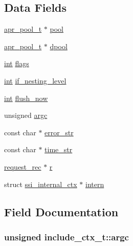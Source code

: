 \subsection*{Data Fields}
\begin{DoxyCompactItemize}
\item 
\hyperlink{structapr__pool__t}{apr\+\_\+pool\+\_\+t} $\ast$ \hyperlink{structinclude__ctx__t_af20d93a99a0b9fd4b7aaa29eb91d5195}{pool}
\item 
\hyperlink{structapr__pool__t}{apr\+\_\+pool\+\_\+t} $\ast$ \hyperlink{structinclude__ctx__t_aa60a17ecec50d2d5ce1359378abc4c05}{dpool}
\item 
\hyperlink{pcre_8txt_a42dfa4ff673c82d8efe7144098fbc198}{int} \hyperlink{structinclude__ctx__t_a8890ffbba1a44e4297b0a9445dc4ab9a}{flags}
\item 
\hyperlink{pcre_8txt_a42dfa4ff673c82d8efe7144098fbc198}{int} \hyperlink{structinclude__ctx__t_a6afca03dc4dd72a5440f1f634365a058}{if\+\_\+nesting\+\_\+level}
\item 
\hyperlink{pcre_8txt_a42dfa4ff673c82d8efe7144098fbc198}{int} \hyperlink{structinclude__ctx__t_a1822b2fd44a24681553120df1d9cdf82}{flush\+\_\+now}
\item 
unsigned \hyperlink{structinclude__ctx__t_ac9a3a1a928c6c3fae4fc6aa03c49a2e2}{argc}
\item 
const char $\ast$ \hyperlink{structinclude__ctx__t_a8f01585ae19eb53dcd5d8505d23d8ea2}{error\+\_\+str}
\item 
const char $\ast$ \hyperlink{structinclude__ctx__t_ad96f0ea28c23d20f0e7817a57dc98943}{time\+\_\+str}
\item 
\hyperlink{structrequest__rec}{request\+\_\+rec} $\ast$ \hyperlink{structinclude__ctx__t_a84929bd794dca8b08725cbc733b3f5ff}{r}
\item 
struct \hyperlink{structssi__internal__ctx}{ssi\+\_\+internal\+\_\+ctx} $\ast$ \hyperlink{structinclude__ctx__t_ad52b688b075100f9955d79dbde939340}{intern}
\end{DoxyCompactItemize}


\subsection{Field Documentation}
\subsubsection[{\texorpdfstring{argc}{argc}}]{\setlength{\rightskip}{0pt plus 5cm}unsigned include\+\_\+ctx\+\_\+t\+::argc}\hypertarget{structinclude__ctx__t_ac9a3a1a928c6c3fae4fc6aa03c49a2e2}{}\label{structinclude__ctx__t_ac9a3a1a928c6c3fae4fc6aa03c49a2e2}
